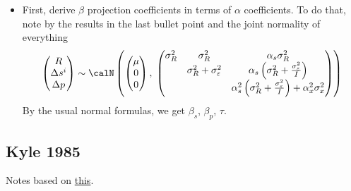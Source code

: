 \documentclass[12pt]{article}
\theoremstyle{plain}
\theoremstyle{definition}
\theoremstyle{remark}
\begin{document}
\begin{itemize}
  \item
    First, derive $\beta$ projection coefficients in terms of $\alpha$
    coefficients. To do that, note by the results in the last bullet
    point and the joint normality of everything
    \begin{align*}
      \begin{pmatrix}
        R \\  \Delta s^i \\ \Delta p
      \end{pmatrix}
      \sim
      \calN
      \left(
      \begin{pmatrix}
        \mu \\  0 \\ 0
      \end{pmatrix},\;
      \begin{pmatrix}
        \sigma^2_R
          & \sigma^2_R
          & \alpha_s\sigma^2_R\\
          & \sigma^2_R+\sigma^2_\varepsilon
          & \alpha_s
          \left(\sigma^2_R+\frac{\sigma^2_\varepsilon}{I}\right)\\
          &
          &
          \alpha_s^2
          \left(\sigma^2_R+\frac{\sigma^2_\varepsilon}{I}\right) + \alpha_x^2 \sigma^2_x
      \end{pmatrix}
      \right)
    \end{align*}
    By the usual normal formulas, we get $\beta_s$, $\beta_p$, $\tau$.

\end{itemize}




\clearpage
\subsection{Kyle 1985}

Notes based on
\href{http://www.alexchinco.com/comparing-kyle-and-grossman-stiglitz/}{this}.










\end{document}
